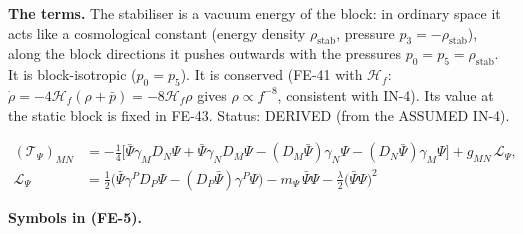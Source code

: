 \documentclass[
  10pt,
]{article}
\begin{document}
\textbf{The terms.} The stabiliser is a vacuum energy of the block: in
ordinary space it acts like a cosmological constant (energy density
\(\rho_{\mathrm{stab}}\), pressure \(p_3 = -\rho_{\mathrm{stab}}\)),
along the block directions it pushes outwards with the pressures
\(p_0 = p_5 = \rho_{\mathrm{stab}}\). It is block-isotropic
(\(p_0 = p_5\)). It is conserved (FE-41 with \(\mathcal{H}_f\):
\(\dot\rho = -4\mathcal{H}_f(\rho + \bar p) = -8\mathcal{H}_f\rho\)
gives \(\rho \propto f^{-8}\), consistent with IN-4). Its value at the
static block is fixed in FE-43. Status: DERIVED (from the ASSUMED IN-4).

\[
\begin{aligned}
(\mathcal{T}_\Psi)_{MN} &= -\frac14\Big[\bar\Psi\gamma_MD_N\Psi + \bar\Psi\gamma_ND_M\Psi -
 (D_M\bar\Psi)\gamma_N\Psi
 - (D_N\bar\Psi)\gamma_M\Psi\Big] + g_{MN}\,\mathcal{L}_\Psi,\\
\mathcal{L}_\Psi &= \tfrac12\big(\bar\Psi\gamma^PD_P\Psi - (D_P\bar\Psi)\gamma^P\Psi\big) -
 m_\Psi\,\bar\Psi\Psi
 - \frac{\lambda}{2}\big(\bar\Psi\Psi\big)^2
\end{aligned} \tag{FE-5}
\]

\textbf{Symbols in (FE-5).}
\end{document}
